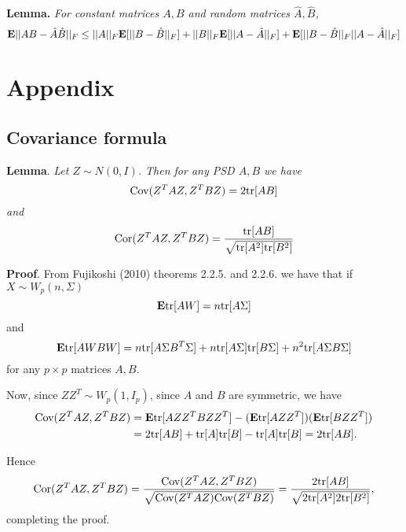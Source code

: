 \documentclass[12pt]{article}
\begin{document}
\noindent\textbf{Lemma.}
\emph{For constant matrices $A, B$ and random matrices $\hat{A}, \hat{B}$,}
\[
\textbf{E}||AB - \hat{A}\hat{B}||_F \leq
||A||_F\textbf{E}[||B-\hat{B}||_F] + 
||B||_F\textbf{E}[||A - \hat{A}||_F] + 
\textbf{E}[||B-\hat{B}||_F||A - \hat{A}||_F]
\]


\section{Appendix}

\subsection{Covariance formula} 

\noindent\textbf{Lemma}. \emph{
Let $Z \sim N(0, I)$.  Then for any PSD $A, B$ we have
\[
\text{Cov}(Z^T A Z, Z^T B Z) = 2\text{tr}[AB]
\]
and
\[
\text{Cor}(Z^TA Z, Z^T B Z) = \frac{\text{tr}[AB]}{\sqrt{\text{tr}[A^2]\text{tr}[B^2]}}
\]
}

\textbf{Proof}.
From Fujikoshi (2010) theorems 2.2.5. and 2.2.6. we have that if $X \sim W_p(n, \Sigma)$
\[
\textbf{E}\text{tr}[AW] = n \text{tr}[A\Sigma]
\]
and
\[
\textbf{E}\text{tr}[AWBW] = n\text{tr}[A\Sigma B^T \Sigma] + n\text{tr}[A\Sigma]\text{tr}[B\Sigma] + n^2\text{tr}[A\Sigma B\Sigma]
\]
for any $p \times p$ matrices $A, B$.

Now, since $ZZ^T \sim W_p(1, I_p)$, since $A$ and $B$ are symmetric, we have
\begin{align*}
\text{Cov}(Z^T A Z, Z^T B Z) &= \textbf{E}\text{tr}[AZZ^T BZZ^T] - (\textbf{E}\text{tr}[AZZ^T])(\textbf{E}\text{tr}[BZZ^T])
\\&= 2\text{tr}[AB] + \text{tr}[A]\text{tr}[B] - \text{tr}[A]\text{tr}[B]= 2\text{tr}[AB].
\end{align*}

Hence
\[
\text{Cor}(Z^T A Z, Z^T B Z) = \frac{\text{Cov}(Z^T A Z, Z^T B Z)}{\sqrt{\text{Cov}(Z^T A Z) \text{Cov}(Z^T B Z)}} = \frac{2\text{tr}[AB]}{\sqrt{2\text{tr}[A^2]2\text{tr}[B^2]}},
\]
completing the proof.
\end{document}
